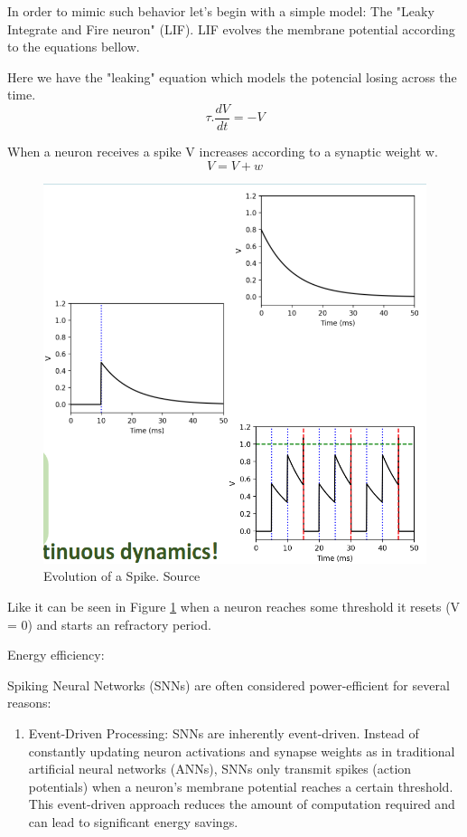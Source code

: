 \begin{frame}[allowframebreaks]
	\par In order to mimic such behavior let's begin with a simple model: The "Leaky Integrate and Fire neuron" (LIF). LIF evolves the membrane potential according to the equations bellow.
	
	\par Here we have the "leaking" equation which models the potencial losing across the time.
	\begin{equation}
		\tau . \dfrac{dV}{dt} = -V
		\label{eq:leak}
	\end{equation}
	
	\par When a neuron receives a spike V increases according to a synaptic weight w.
	\begin{equation}
		V = V + w
	\end{equation}


	\begin{figure}
		\centering
		\includegraphics[width=0.5\linewidth]{images/neuronSpikes2}
		\caption{Evolution of a Spike. Source \cite{dan_goodman_2022_7044500}}
		\label{fig:neuronspikes2}
	\end{figure}

	\par Like it can be seen in Figure \ref{fig:neuronspikes2} when a neuron reaches some threshold it resets (V = 0) and starts an refractory period.
	
	\par Energy efficiency:
	
	\par Spiking Neural Networks (SNNs) are often considered power-efficient for several reasons:
	
	\begin{enumerate}
		\item Event-Driven Processing: SNNs are inherently event-driven. Instead of constantly updating neuron activations and synapse weights as in traditional artificial neural networks (ANNs), SNNs only transmit spikes (action potentials) when a neuron's membrane potential reaches a certain threshold. This event-driven approach reduces the amount of computation required and can lead to significant energy savings.
	

\end{enumerate}
\end{frame}
